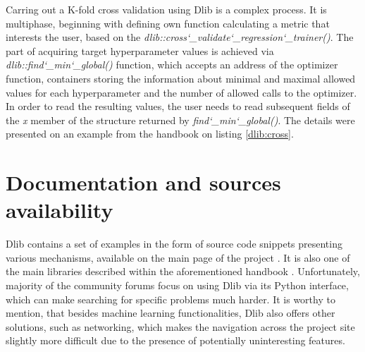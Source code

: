 Carring out a K-fold cross validation using Dlib is a complex process. It is multiphase, beginning with defining own function calculating a metric that interests the user, based on the \textit{dlib::cross\char`_validate\char`_regression\char`_trainer()}. The part of acquiring target hyperparameter values is achieved via \textit{dlib::find\char`_min\char`_global()} function, which accepts an address of the optimizer function, containers storing the information about minimal and maximal allowed values for each hyperparameter and the number of allowed calls to the optimizer. In order to read the resulting values, the user needs to read subsequent fields of the \textit{x} member of the structure returned by \textit{find\char`_min\char`_global()}. The details were presented on an example from the handbook \cite{handsOnMachineLearning} on listing \ref{dlib:cross}.


\section{Documentation and sources availability}

Dlib contains a set of examples in the form of source code snippets presenting various mechanisms, available on the main page of the project \cite{dlib:home}. It is also one of the main libraries described within the aforementioned handbook \cite{handsOnMachineLearning}. Unfortunately, majority of the community forums focus on using Dlib via its Python interface, which can make searching for specific problems much harder. It is worthy to mention, that besides machine learning functionalities, Dlib also offers other solutions, such as networking, which makes the navigation across the project site slightly more difficult due to the presence of potentially uninteresting features.
